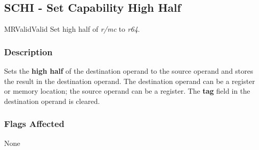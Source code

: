 \clearpage
{}
{}
\subsection*{SCHI - Set Capability High Half}

\begin{x86opcodetable}
  {MR}{Valid}{Valid}
  {Set high half of \emph{r/mc} to \emph{r64}.}
\end{x86opcodetable}

\begin{x86opentable}
\end{x86opentable}

\subsubsection*{Description}

Sets the \textbf{high half} of the destination operand to the source
operand and stores the result in the destination operand.  The
destination operand can be a register or memory location; the source
operand can be a register.  The \textbf{tag} field in the destination
operand is cleared.

\subsubsection*{Flags Affected}

None
